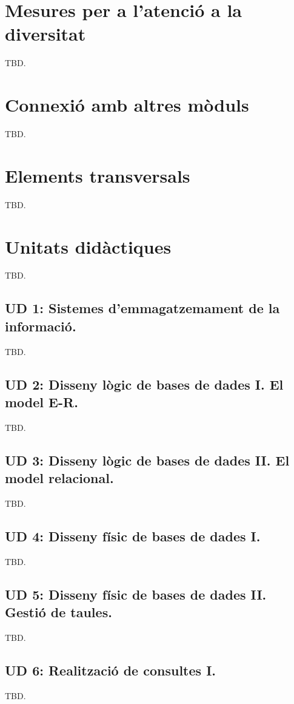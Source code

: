 \documentclass[catalan, a4paper, 12pt, titlepage]{article}
\begin{document}
\section{Mesures per a l'atenció a la diversitat}
TBD.

\section{Connexió amb altres mòduls}
TBD.

\section{Elements transversals}
TBD.

\section{Unitats didàctiques}
TBD.

  \subsection{UD 1: Sistemes d'emmagatzemament de la informació.}
  TBD.

  \subsection{UD 2: Disseny lògic de bases de dades I. El model E-R.}
  TBD.

  \subsection{UD 3: Disseny lògic de bases de dades II. El model relacional.}
  TBD.

  \subsection{UD 4: Disseny físic de bases de dades I.}
  TBD.

  \subsection{UD 5: Disseny físic de bases de dades II. Gestió de taules.}
  TBD.

  \subsection{UD 6: Realització de consultes I.}
  TBD.
\end{document}
